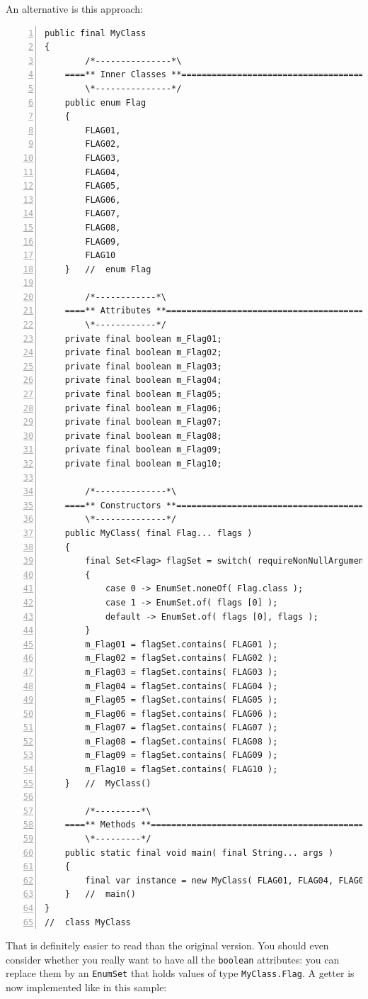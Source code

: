 \documentclass[11pt,a4paper, titlepage, parskip=half, headsepline, footsepline, cleardoublepage=current, headheight=1cm]{scrbook}
\begin{document}
An alternative is this approach:
\begin{lstlisting}[numbers=left]
public final MyClass
{
        /*---------------*\
    ====** Inner Classes **==========================================
        \*---------------*/
    public enum Flag
    {
        FLAG01,
        FLAG02,
        FLAG03,
        FLAG04,
        FLAG05,
        FLAG06,
        FLAG07,
        FLAG08,
        FLAG09,
        FLAG10
    }   //  enum Flag    
   
        /*------------*\
    ====** Attributes **=============================================    
        \*------------*/
    private final boolean m_Flag01;
    private final boolean m_Flag02;
    private final boolean m_Flag03;
    private final boolean m_Flag04;
    private final boolean m_Flag05;
    private final boolean m_Flag06;
    private final boolean m_Flag07;
    private final boolean m_Flag08;
    private final boolean m_Flag09;
    private final boolean m_Flag10;
    
        /*--------------*\
    ====** Constructors **===========================================
        \*--------------*/
    public MyClass( final Flag... flags )
    {
        final Set<Flag> flagSet = switch( requireNonNullArgument( flags, "flags" ).length )
        {
            case 0 -> EnumSet.noneOf( Flag.class );
            case 1 -> EnumSet.of( flags [0] );
            default -> EnumSet.of( flags [0], flags );
        }
        m_Flag01 = flagSet.contains( FLAG01 );
        m_Flag02 = flagSet.contains( FLAG02 );
        m_Flag03 = flagSet.contains( FLAG03 );
        m_Flag04 = flagSet.contains( FLAG04 );
        m_Flag05 = flagSet.contains( FLAG05 );
        m_Flag06 = flagSet.contains( FLAG06 );
        m_Flag07 = flagSet.contains( FLAG07 );
        m_Flag08 = flagSet.contains( FLAG08 );
        m_Flag09 = flagSet.contains( FLAG09 );
        m_Flag10 = flagSet.contains( FLAG10 );
    }   //  MyClass()
    
        /*---------*\
    ====** Methods **================================================
        \*---------*/
    public static final void main( final String... args )
    {
        final var instance = new MyClass( FLAG01, FLAG04, FLAG06, FLAG08 );
    }   //  main()
}
//  class MyClass
\end{lstlisting}
That is definitely easier to read than the original version. You should even consider whether you really want to have all the \lstinline|boolean| attributes: you can replace them by an \lstinline|EnumSet|\autocite{ORACLE_DOC_ENUMSET_CLASS} that holds values of type \lstinline|MyClass.Flag|. A getter is now implemented like in this sample:
\end{document}
